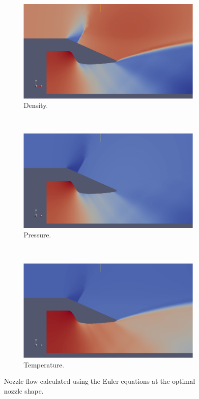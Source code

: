 \documentclass{article}
\begin{document}
\begin{figure}[t!]
    \centering
    \begin{subfigure}[t]{0.33\textwidth}
        \centering
        \includegraphics[width=0.85\linewidth]{figs/det_medfi_density.png}
        \caption{Density.}
    \end{subfigure}%
    ~ 
    \begin{subfigure}[t]{0.33\textwidth}
        \centering
        \includegraphics[width=0.85\linewidth]{figs/det_medfi_pressure.png}
        \caption{Pressure.}
    \end{subfigure}%
    ~
    \begin{subfigure}[t]{0.33\textwidth}
        \centering
        \includegraphics[width=0.85\linewidth]{figs/det_medfi_temp.png}
        \caption{Temperature.}
    \end{subfigure}
    \caption{Nozzle flow calculated using the Euler equations at the optimal nozzle shape.}
    \label{fig:minWeightMedfiDetFlow}
\end{figure}
\end{document}
